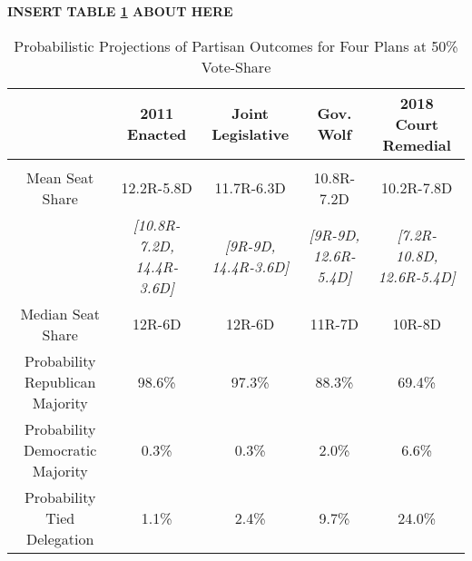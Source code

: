 


 \begin{center}\textbf{INSERT TABLE \ref{tab:prob} ABOUT HERE} \end{center}


\begin{landscape}
\begin{table}[!htbp] \centering 
  \caption{Probabilistic Projections of Partisan Outcomes for Four Plans at 50\% Vote-Share} 
  \label{tab:prob} 
\begin{tabular}{@{\extracolsep{-5pt}} ccccc} 
 & 2011 Enacted & Joint Legislative & Gov. Wolf & 2018 Court Remedial \\ 
\hline \\[-1.8ex] 
Mean Seat Share & 12.2R-5.8D & 11.7R-6.3D & 10.8R-7.2D & 10.2R-7.8D \\ 
 & {\small\textit{[10.8R-7.2D, 14.4R-3.6D]}} & {\small\textit{[9R-9D, 14.4R-3.6D]}} & {\small\textit{[9R-9D, 12.6R-5.4D]}} & {\small\textit{[7.2R-10.8D, 12.6R-5.4D]}} \\ 
Median Seat Share & 12R-6D & 12R-6D & 11R-7D & 10R-8D \\ 
Probability Republican Majority & 98.6\% & 97.3\% & 88.3\% & 69.4\% \\ 
Probability Democratic Majority & 0.3\% & 0.3\% & 2.0\% & 6.6\% \\ 
Probability Tied Delegation & 1.1\% & 2.4\% & 9.7\% & 24.0\% \\ 
\end{tabular}
\end{table}
\end{landscape}
 
 

